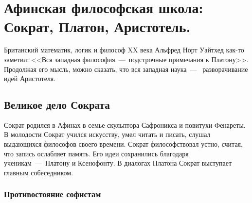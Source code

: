 \section{Афинская философская школа: Сократ, Платон, Аристотель.}

Британский математик, логик и философ XX века Альфред Норт Уайтхед как-то заметил: <<Вся западная философия~---~подстрочные примечания к Платону>>. 
Продолжая его мысль, можно сказать, что вся западная наука~---~ разворачивание идей Аристотеля.

\subsection{Великое дело Сократа}



Сократ родился в Афинах в семье скульптора Сафроникса и повитухи Фенареты. В молодости Сократ учился искусству, умел читать и писать, слушал выдающихся философов своего времени. Сократ философствовал устно, считая, что запись ослабляет память. Его идеи сохранились благодаря ученикам~---~Платону и Ксенофонту. В диалогах Платона Сократ выступает главным собеседником.


\subsubsection{Противостояние софистам}


